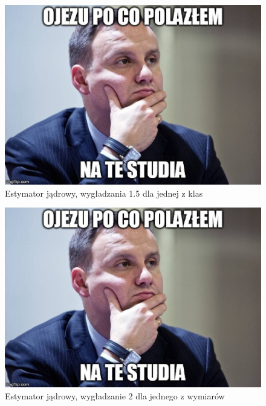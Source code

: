 \documentclass[a4paper,12pt,twoside]{article}
\begin{document}
\begin{figure}
    \centering
    \includegraphics[width=1.2\textwidth]{dudel.jpg}
    \caption{Estymator jądrowy, wygładzania 1.5 dla jednej z klas}
\end{figure}
\vfill
\clearpage
\newpage
\vfill 
\begin{figure}
    \centering
    \includegraphics[width=1.2\textwidth]{dudel.jpg}
    \caption{Estymator jądrowy, wygładzanie 2 dla jednego z wymiarów}
\end{figure}
\end{document}
